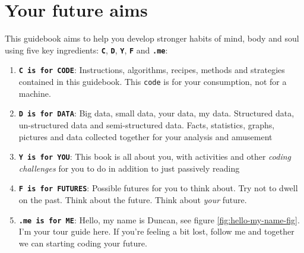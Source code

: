 \documentclass[
]{book}
\providecommand{\tightlist}{%
  \setlength{\itemsep}{0pt}\setlength{\parskip}{0pt}}
\begin{document}
\hypertarget{vaccine}{%
\section{Your future aims}\label{vaccine}}

This guidebook aims to help you develop stronger habits of mind, body and soul using five key ingredients: \textbf{\texttt{C}}, \textbf{\texttt{D}}, \textbf{\texttt{Y}}, \textbf{\texttt{F}} and \textbf{\texttt{.me}}:

\begin{enumerate}
\def\labelenumi{\arabic{enumi}.}
\tightlist
\item
  \textbf{\texttt{C\ is\ for\ CODE}}: Instructions, algorithms, recipes, methods and strategies contained in this guidebook. This \texttt{code} is for your consumption, not for a machine.
\item
  \textbf{\texttt{D\ is\ for\ DATA}}: Big data, small data, your data, my data. Structured data, un-structured data and semi-structured data. Facts, statistics, graphs, pictures and data collected together for your analysis and amusement
\item
  \textbf{\texttt{Y\ is\ for\ YOU}}: This book is all about you, with activities and other \emph{coding challenges} for you to do in addition to just passively reading
\item
  \textbf{\texttt{F\ is\ for\ FUTURES}}: Possible futures for you to think about. Try not to dwell on the past. Think about the future. Think about \emph{your} future. \citep{thinkaboutthefuture, wroteforluck}
\item
  \textbf{\texttt{.me\ is\ for\ ME}}: Hello, my name is Duncan, see figure \ref{fig:hello-my-name-fig}. I'm your tour guide here. If you're feeling a bit lost, follow me and together we can starting coding your future.
\end{enumerate}
\end{document}
